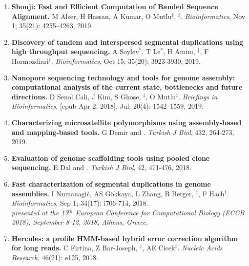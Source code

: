 \begin{enumerate}
\item
{\bf Shouji: Fast and Efficient Computation of Banded Sequence Alignment.} M Alser, H Hassan, A Kumar, O Mutlu$^\ddag$, \calkan{}$^\ddag$.
{\em Bioinformatics}, Nov 1;   35(21): 4255–4263, 2019.


\item
 {\bf Discovery of tandem and interspersed segmental duplications using high throughput sequencing.}
 A Soylev$^*$, T Le$^*$, H Amini, \calkan{}$^\ddag$, F Hormozdiari$^\ddag$.
{\em Bioinformatics}, Oct 15;   35(20): 3923-3930, 2019.


         
\item

         {\bf Nanopore sequencing technology and tools for genome assembly: computational analysis of the current state, bottlenecks and future directions.}
         D Senol Cali, J Kim, S Ghose, \calkan{}$^\ddag$, O Mutlu$^\ddag$.
         {\em Briefings in Bioinformatics}, [epub Apr 2, 2018], Jul;   20(4): 1542–1559, 2019.

\item
         {\bf Characterizing microsatellite polymorphisms using assembly-based and mapping-based tools.}  G Demir and \calkan{}. {\em Turkish J Biol}, 432, 264-273, 2019.


         \item
         {\bf Evaluation of genome scaffolding tools using pooled clone sequencing.}  E Dal and \calkan{}. {\em Turkish J Biol}, 42, 471-476, 2018.
         
         \item

         {\bf Fast characterization of segmental duplications in genome assemblies.}
         I Numanagić,  AS Gökkaya, L Zhang, B Berger, \calkan{}$^\ddag$, F Hach$^\ddag$.
         {\em Bioinformatics}, Sep 1;   34(17): i706-714, 2018.\\
         \hspace*{1cm}
          {\footnotesize \em presented at the 17$^{th}$ European Conference for Computational Biology (ECCB 2018), September 8-12, 2018, Athens, Greece.}

                \item
                {\bf Hercules: a profile HMM-based hybrid error correction algorithm for long reads.}
                C Firtina, Z Bar-Joseph, \calkan{}$^\ddag$, AE Cicek$^\ddag$.
                {\it Nucleic Acids Research}, 46(21): e125, 2018.
                

\end{enumerate}
